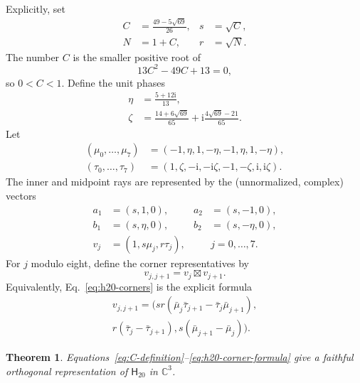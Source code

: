 \documentclass[twocolumn,aps,pra,floatfix,amsmath,amssymb,longbibliography]{revtex4-2}
\newtheorem{theorem}{Theorem}
\theoremstyle{definition}
\theoremstyle{remark}
\newcommand{\ii}{\mathrm{i}}
\newcommand{\C}{\mathbb C}
\newcommand{\Htwenty}{\mathsf H_{20}}
\begin{document}
Explicitly, set
\begin{equation}
 \begin{aligned}
 C&=\frac{49-5\sqrt{69}}{26},&s&=\sqrt C,\\
 N&=1+C,&r&=\sqrt N.
 \end{aligned}
 \label{eq:C-definition}
\end{equation}
The number $C$ is the smaller positive root of
\begin{equation}
 13C^2-49C+13=0,
 \label{eq:C-polynomial}
\end{equation}
so $0<C<1$.  Define the unit phases
\begin{align}
 \eta&=\frac{5+12\ii}{13},\label{eq:eta}\\
 \zeta&=\frac{14+6\sqrt{69}}{65}
 +\ii\frac{4\sqrt{69}-21}{65}.
 \label{eq:zeta}
\end{align}
Let
\begin{align*}
 (\mu_0,\ldots,\mu_7)&=(-1,\eta,1,-\eta,-1,\eta,1,-\eta),\\
 (\tau_0,\ldots,\tau_7)&=(1,\zeta,-\ii,-\ii\zeta,
 -1,-\zeta,\ii,\ii\zeta).
\end{align*}
The inner and midpoint rays are represented by the (unnormalized, complex)
vectors
\begin{align}
 a_1&=(s,1,0),&a_2&=(s,-1,0),\nonumber\\
 b_1&=(s,\eta,0),&b_2&=(s,-\eta,0),
 \label{eq:h20-inner-vectors}\\
 v_j&=(1,s\mu_j,r\tau_j),&&j=0,\ldots,7.
 \label{eq:h20-midpoints}
\end{align}
For $j$ modulo eight, define the corner representatives by
\begin{equation}
 v_{j,j+1}=v_j\boxtimes v_{j+1}.
 \label{eq:h20-corners}
\end{equation}
Equivalently, Eq.~\eqref{eq:h20-corners} is the explicit formula
\begin{multline}
 v_{j,j+1}=\bigl(
 sr(\bar\mu_j\bar\tau_{j+1}-\bar\tau_j\bar\mu_{j+1}),\\
 r(\bar\tau_j-\bar\tau_{j+1}),
 s(\bar\mu_{j+1}-\bar\mu_j)\bigr).
 \label{eq:h20-corner-formula}
\end{multline}

\begin{theorem}
\label{thm:h20-complex}
Equations~\eqref{eq:C-definition}--\eqref{eq:h20-corner-formula}
give a faithful orthogonal representation of $\Htwenty$ in $\C^3$.
\end{theorem}
\end{document}
